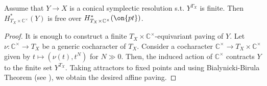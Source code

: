 \documentclass[12pt]{amsart}
\begin{document}
\begin{lemma}\label{lemma_equiv_cohom_resol_free}
Assume that $Y \rightarrow X$ is a conical symplectic resolution s.t. $Y^{T_X}$ is finite. Then $H^*_{T_X \times \mathbb{C}^\times}(Y)$ is free over $H^*_{T_X \times \mathbb{C}^\times}(\on{pt})$.
\end{lemma}
\begin{proof}
It is enough to construct a finite $T_X \times \mathbb{C}^\times$-equivariant paving of $Y$. Let $\nu\colon \mathbb{C}^\times \rightarrow T_X$ be a generic cocharacter of $T_X$.
Consider a cocharacter $\mathbb{C}^\times \rightarrow T_X \times \mathbb{C}^\times$ given by $t \mapsto (\nu(t),t^{N})$ for $N \gg 0$. Then, the induced action of $\mathbb{C}^\times$ contracts $Y$ to the finite set $Y^{T_X}$. Taking attractors to fixed points and using Bialynicki-Birula Theorem (see \cite[Section 4]{Bialynicki-Birula}), we obtain the desired affine paving.
\end{proof}

    







\end{document}
